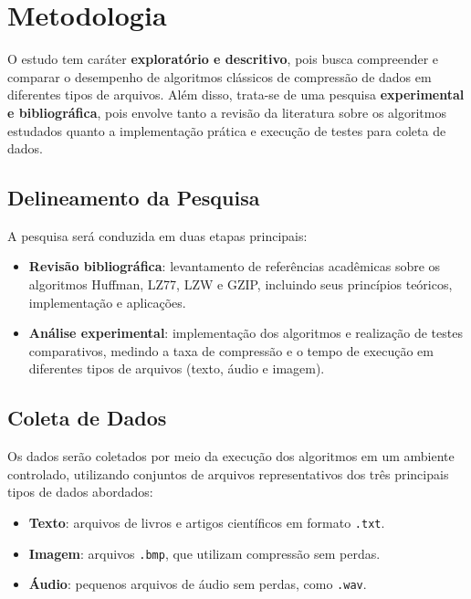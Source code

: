\chapter{Metodologia}
\label{c.metodologia}

O estudo tem caráter \textbf{exploratório e descritivo}, pois busca compreender e comparar o desempenho de algoritmos clássicos de compressão de dados em diferentes tipos de arquivos. Além disso, trata-se de uma pesquisa \textbf{experimental e bibliográfica}, pois envolve tanto a revisão da literatura sobre os algoritmos estudados quanto a implementação prática e execução de testes para coleta de dados.

\section{Delineamento da Pesquisa}

A pesquisa será conduzida em duas etapas principais:

\begin{itemize}
    \item \textbf{Revisão bibliográfica}: levantamento de referências acadêmicas sobre os algoritmos Huffman, LZ77, LZW e GZIP, incluindo seus princípios teóricos, implementação e aplicações.
    \item \textbf{Análise experimental}: implementação dos algoritmos e realização de testes comparativos, medindo a taxa de compressão e o tempo de execução em diferentes tipos de arquivos (texto, áudio e imagem).
\end{itemize}

\section{Coleta de Dados}

Os dados serão coletados por meio da execução dos algoritmos em um ambiente controlado, utilizando conjuntos de arquivos representativos dos três principais tipos de dados abordados: 

\begin{itemize}
    \item \textbf{Texto}: arquivos de livros e artigos científicos em formato \texttt{.txt}.
    \item \textbf{Imagem}: arquivos \texttt{.bmp}, que utilizam compressão sem perdas.
    \item \textbf{Áudio}: pequenos arquivos de áudio sem perdas, como \texttt{.wav}.
\end{itemize}


